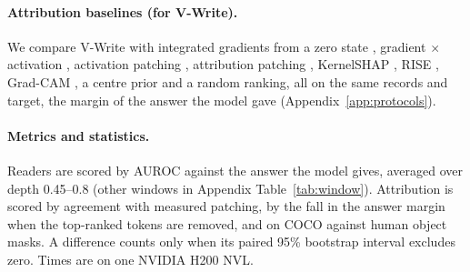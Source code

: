 \paragraph{Attribution baselines (for V-Write).} We compare V-Write with integrated gradients from a zero state \citep{sundararajan2017axiomaticattributiondeepnetworks}, gradient $\times$ activation \citep{shrikumar2017justblackboxlearning}, activation patching \citep{meng2023locatingeditingfactualassociations}, attribution patching \citep{syed2023attributionpatchingoutperformsautomated, kramár2024atpefficientscalablemethod}, KernelSHAP \citep{lundberg2017unifiedapproachinterpretingmodel}, RISE \citep{petsiuk2018riserandomizedinputsampling}, Grad-CAM \citep{Selvaraju_2019}, a centre prior and a random ranking, all on the same records and target, the margin of the answer the model gave (Appendix~\ref{app:protocols}).

\paragraph{Metrics and statistics.} Readers are scored by AUROC against the answer the model gives, averaged over depth 0.45--0.8 (other windows in Appendix Table~\ref{tab:window}). Attribution is scored by agreement with measured patching, by the fall in the answer margin when the top-ranked tokens are removed, and on COCO against human object masks. A difference counts only when its paired 95\% bootstrap interval excludes zero. Times are on one NVIDIA H200 NVL.